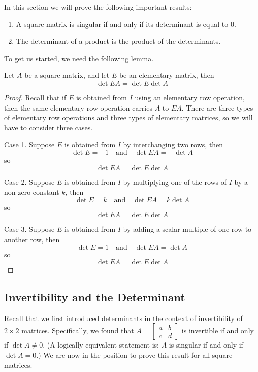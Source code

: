 \documentclass{ximera}
\begin{document}
In this section we will prove the following important results:
\begin{enumerate}
\item A square matrix is singular if and only if its determinant is equal to 0.
\item The determinant of a product is the product of the determinants.
\end{enumerate}
To get us started, we need the following lemma.

\begin{lemma}\label{lemma:detelemproduct} Let $A$ be a square matrix, and let $E$ be an elementary matrix, then
$$\det{EA}=\det{E}\det{A}$$
\end{lemma}
\begin{proof} Recall that if $E$ is obtained from $I$ using an elementary row operation, then the same elementary row operation carries $A$ to $EA$.  There are three types of elementary row operations and three types of elementary matrices, so we will have to consider three cases.

Case 1.  Suppose $E$ is obtained from $I$ by interchanging two rows, then
$$\det{E}=-1\quad\text{and}\quad \det{EA}=-\det{A}$$
so
$$\det{EA}=\det{E}\det{A}$$

Case 2.  Suppose $E$ is obtained from $I$ by multiplying one of the rows of $I$ by a non-zero constant $k$, then
$$\det{E}=k\quad\text{and}\quad \det{EA}=k\det{A}$$
so
$$\det{EA}=\det{E}\det{A}$$

Case 3.  Suppose $E$ is obtained from $I$ by adding a scalar multiple of one row to another row, then
$$\det{E}=1\quad\text{and}\quad \det{EA}=\det{A}$$
so
$$\det{EA}=\det{E}\det{A}$$
\end{proof}
\subsection*{Invertibility and the Determinant}
Recall that we first introduced determinants in the context of invertibility of $2\times 2$ matrices. Specifically, we found that $A=\begin{bmatrix}a&b\\c&d\end{bmatrix}$ is invertible if and only if $\det{A}\neq 0$.  (A logically equivalent statement is: $A$ is singular if and only if $\det{A}=0$.)   We are now in the position to prove this result for all square matrices.
\end{document}

